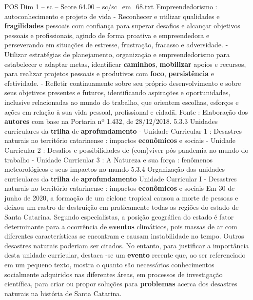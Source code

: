 \begin{textsample}{POS Dim 1 – sc – Score 64.00 – sc/sc\_em\_68.txt}
Empreendedorismo : autoconhecimento e projeto de vida - Reconhecer e utilizar qualidades e \textbf{fragilidades} pessoais com confiança para superar desafios e alcançar objetivos pessoais e profissionais, agindo de forma proativa e empreendedora e perseverando em situações de estresse, frustração, fracasso e adversidade. - Utilizar estratégias de planejamento, organização e empreendedorismo para estabelecer e adaptar metas, identificar \textbf{caminhos}, \textbf{mobilizar} apoios e recursos, para realizar projetos pessoais e produtivos com \textbf{foco}, \textbf{persistência} e efetividade. - Refletir continuamente sobre seu próprio desenvolvimento e sobre seus objetivos presentes e futuros, identificando aspirações e oportunidades, inclusive relacionadas ao mundo do trabalho, que orientem escolhas, esforços e ações em relação à sua vida pessoal, profissional e cidadã.
Fonte : Elaboração dos \textbf{autores} com base na Portaria nº 1.432, de 28/12/2018. 5.3.3 Unidades curriculares da \textbf{trilha} de \textbf{aprofundamento} - Unidade Curricular 1 : Desastres naturais no território catarinense : impactos \textbf{econômicos} e sociais - Unidade Curricular 2 : Desafios e possibilidades de (com)viver pós-pandemia no mundo do trabalho - Unidade Curricular 3 : A Natureza e sua força : fenômenos meteorológicos e seus impactos no mundo 5.3.4 Organização das unidades curriculares da \textbf{trilha} de \textbf{aprofundamento} Unidade Curricular I - Desastres naturais no território catarinense : impactos \textbf{econômicos} e sociais Em 30 de junho de 2020, a formação de um ciclone tropical causou a morte de pessoas e deixou um rastro de destruição em praticamente todas as regiões do estado de Santa Catarina.
Segundo especialistas, a posição geográfica do estado é fator determinante para a ocorrência de \textbf{eventos} climáticos, pois massas de ar com diferentes características se encontram e causam instabilidade no tempo.
Outros desastres naturais poderiam ser citados.
No entanto, para justificar a importância desta unidade curricular, destaca -se um \textbf{evento} recente que, ao ser referenciado em um pequeno texto, mostra o quanto são necessários conhecimentos socialmente adquiridos nas diferentes áreas, em processos de investigação científica, para criar ou propor soluções para \textbf{problemas} acerca dos desastres naturais na história de Santa Catarina.

\end{textsample}
